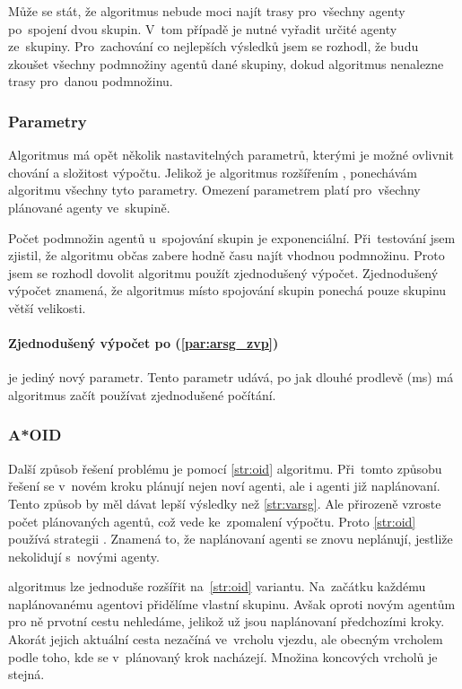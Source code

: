 Může se stát, že algoritmus nebude moci najít trasy pro~všechny agenty po~spojení dvou skupin.
V~tom případě je nutné vyřadit určité agenty ze~skupiny.
Pro~zachování co nejlepších výsledků jsem se rozhodl, že budu zkoušet všechny podmnožiny agentů dané skupiny,
dokud algoritmus nenalezne trasy pro~danou podmnožinu.

\subsubsection{Parametry}\label{subsubsec:arsg_parametry}
Algoritmus má opět několik nastavitelných parametrů, kterými je možné ovlivnit chování a složitost výpočtu.
Jelikož je algoritmus rozšířením , ponechávám algoritmu všechny tyto parametry.
Omezení parametrem platí pro~všechny plánované agenty ve~skupině.

Počet podmnožin agentů u~spojování skupin je exponenciální.
Při~testování jsem zjistil, že algoritmu občas zabere hodně času najít vhodnou podmnožinu.
Proto jsem se rozhodl dovolit algoritmu použít zjednodušený výpočet.
Zjednodušený výpočet znamená, že algoritmus místo spojování skupin ponechá pouze skupinu větší velikosti.

\paragraph{Zjednodušený výpočet po (\ref{par:arsg_zvp})} je jediný nový parametr.
Tento parametr udává, po jak dlouhé prodlevě (ms) má algoritmus začít používat zjednodušené počítání.

\subsubsection{A*OID}\label{subsubsec:a_star_aoid}
Další způsob řešení  problému je pomocí \ref{str:oid} algoritmu.
Při~tomto způsobu řešení se v~novém kroku plánují nejen noví agenti, ale i agenti již naplánovaní.
Tento způsob by měl dávat lepší výsledky než \ref{str:varsg}.
Ale přirozeně vzroste počet plánovaných agentů, což vede ke~zpomalení výpočtu.
Proto \ref{str:oid} používá strategii .
Znamená to, že naplánovaní agenti se znovu neplánují, jestliže nekolidují s~novými agenty.

 algoritmus lze jednoduše rozšířit na~\ref{str:oid} variantu.
Na~začátku každému naplánovanému agentovi přidělíme vlastní skupinu.
Avšak oproti novým agentům pro ně prvotní cestu nehledáme, jelikož už jsou naplánovaní předchozími kroky.
Akorát jejich aktuální cesta nezačíná ve~vrcholu vjezdu,
ale obecným vrcholem podle toho, kde se v~plánovaný krok nacházejí.
Množina koncových vrcholů je stejná.

